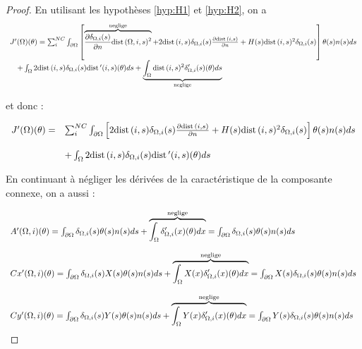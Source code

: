 \documentclass[11pt,a4paper]{article}
\begin{document}
\begin{proof}
	En utilisant les hypothèses \ref{hyp:H1} et \ref{hyp:H2}, on a 
	\begin{equation}
	\begin{array}{l}
	J'(\Omega)(\theta)=\sum_{i}^{NC}\int_{\partial\Omega} \left[\overbrace{\frac{\partial \delta_{\Omega,i}(s)}{\partial n}\textrm{dist}\,(\Omega,i,s)^2}^\text{\textrm{neglige}}+2\textrm{dist}\,(i,s)\delta_{\Omega,i}(s)\frac{\partial\textrm{dist}\,(i,s)}{\partial n}+H(s)\textrm{dist}\,(i,s)^2\delta_{\Omega,i}(s)\right]\theta(s)n(s)ds\\
	\quad +\int_{\Omega} 2\textrm{dist}\,(i,s)\delta_{\Omega,i}(s)\textrm{dist}\, '(i,s)(\theta)ds+\underbrace{\int_{\Omega} \textrm{dist}\,(i,s)^2\delta_{\Omega,i}'(s)(\theta)ds}_\text{\textrm{neglige}}\\
	\end{array}
	\end{equation}
	
	et donc :
	
	\begin{equation}
	\begin{array}{ll}
	J'(\Omega)(\theta)=&\sum_{i}^{NC}\int_{\partial\Omega} \left[2\textrm{dist}\,(i,s)\delta_{\Omega,i}(s)\frac{\partial\textrm{dist}\,(i,s)}{\partial n}+H(s)\textrm{dist}\,(i,s)^2\delta_{\Omega,i}(s)\right]\theta(s)n(s)ds\\
	\\
	\, & +\int_{\Omega} 2\textrm{dist}\,(i,s)\delta_{\Omega,i}(s)\textrm{dist}\, '(i,s)(\theta)ds
	\end{array}
	\end{equation}
	
	En continuant à négliger les dérivées de la caractéristique de la composante connexe, on a aussi :
	
	\begin{equation}
	\begin{array}{l}
		A'(\Omega,i)(\theta)=\int_{\partial\Omega} \delta_{\Omega,i}(s)\theta(s)n(s)ds+\overbrace{\int_{\Omega} \delta_{\Omega,i}'(x)(\theta)dx}^\text{neglige}= \int_{\partial\Omega} \delta_{\Omega,i}(s)\theta(s)n(s)ds\\
		\\
		Cx'(\Omega,i)(\theta)=\int_{\partial\Omega} \delta_{\Omega,i}(s)X(s)\theta(s)n(s)ds+\overbrace{\int_{\Omega} X(x)\delta_{\Omega,i}'(x)(\theta)dx}^\text{neglige}= \int_{\partial\Omega} X(s)\delta_{\Omega,i}(s)\theta(s)n(s)ds\\
		\\
		Cy'(\Omega,i)(\theta)=\int_{\partial\Omega} \delta_{\Omega,i}(s)Y(s)\theta(s)n(s)ds+\overbrace{\int_{\Omega} Y(x)\delta_{\Omega,i}'(x)(\theta)dx}^\text{neglige}= \int_{\partial\Omega} Y(s)\delta_{\Omega,i}(s)\theta(s)n(s)ds\\
	\end{array}
	\end{equation}
	

\end{proof}
\end{document}
